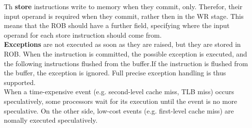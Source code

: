 \documentclass[12pt]{article}
\begin{document}
Th \textbf{store} instructions write to memory when they commit, only. Therefor, their input operand is required when they commit, rather then in the WR stage. This means that the ROB should have a further field, specifying where the input operand for each store instruction should come from.\\
\textbf{Exceptions} are not executed as soon as they are raised, but they are stored in ROB. When the instruction is committed, the possible exception is executed, and the following instructions flushed from the buffer.If the instruction is flushed from the buffer, the exception is ignored. Full precise exception handling is thus supported.\\

When a time-expensive event (e.g. second-level cache miss, TLB miss) occurs speculatively, some processors wait for its execution until the event is no more speculative. On the other side, low-cost events (e.g. first-level cache miss) are nomally executed speculatively.
\end{document}
